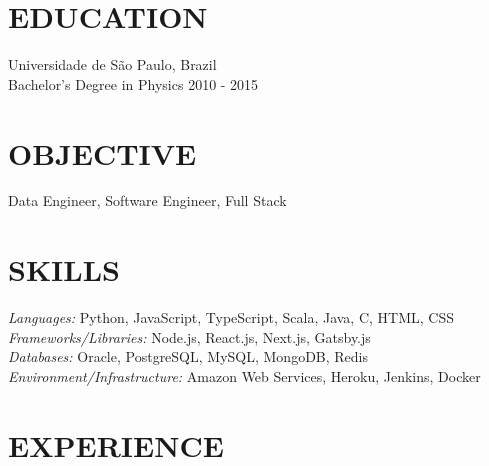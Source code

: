 \documentclass[margin, 10pt]{res} %
\begin{document}
\begin{resume}


\section{EDUCATION}

Universidade de São Paulo, Brazil \\
Bachelor's Degree in Physics \hfill 2010 - 2015


\section{OBJECTIVE}

Data Engineer, Software Engineer, Full Stack
 

\section{SKILLS}

{\sl Languages:} Python, JavaScript, TypeScript, Scala, Java, C, HTML, CSS \\
{\sl Frameworks/Libraries:} Node.js, React.js, Next.js, Gatsby.js \\
{\sl Databases:} Oracle, PostgreSQL, MySQL, MongoDB, Redis \\
{\sl Environment/Infrastructure:} Amazon Web Services, Heroku, Jenkins, Docker
 
 
\section{EXPERIENCE}


\end{resume}
\end{document}
